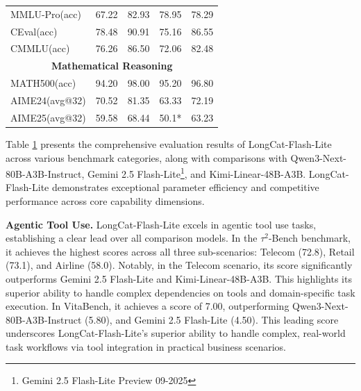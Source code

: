 \documentclass{article}
\newcommand{\longcat}{LongCat-Flash-Lite\xspace}
\begin{document}
\begin{table}[htbp]
{\begin{tabular}{l|ccc|c}
        MMLU-Pro(acc) & 67.22 & {82.93} & 78.95 & 78.29\\
        CEval(acc) & 78.48 & {90.91} & 75.16  & 86.55 \\
        CMMLU(acc) & 76.26 & {86.50} & 72.06  & 82.48 \\
        \midrule
        \multicolumn{5}{c}{\textbf{Mathematical Reasoning}} \\
        \midrule
        MATH500(acc) & 94.20 & {98.00} & 95.20  & 96.80\\
        AIME24(avg@32) & 70.52 & {81.35} & 63.33 & 72.19 \\
        AIME25(avg@32) & 59.58 & {68.44} & 50.1*  & 63.23 \\
        \bottomrule
    \end{tabular}
    }
    \label{tab:chat_model_results}
\end{table}

Table \ref{tab:chat_model_results} presents the comprehensive evaluation results of \longcat across various benchmark categories, along with comparisons with Qwen3-Next-80B-A3B-Instruct, Gemini 2.5 Flash-Lite\footnote{Gemini 2.5 Flash-Lite Preview 09-2025}, and Kimi-Linear-48B-A3B. %
\longcat demonstrates exceptional parameter efficiency and competitive performance across core capability dimensions.

\textbf{Agentic Tool Use.} \longcat excels in agentic tool use tasks, establishing a clear lead over all comparison models. In the $\tau^2$-Bench benchmark, it achieves the highest scores across all three sub-scenarios: Telecom (72.8), Retail (73.1), and Airline (58.0). Notably, in the Telecom scenario, its score significantly outperforms Gemini 2.5 Flash-Lite and Kimi-Linear-48B-A3B. This highlights its superior ability to handle complex dependencies on tools and domain-specific task execution. In VitaBench, it achieves a score of 7.00, outperforming Qwen3-Next-80B-A3B-Instruct (5.80), and Gemini 2.5 Flash-Lite (4.50). This leading score underscores \longcat's superior ability to handle complex, real-world task workflows via tool integration in practical business scenarios.
\end{document}

